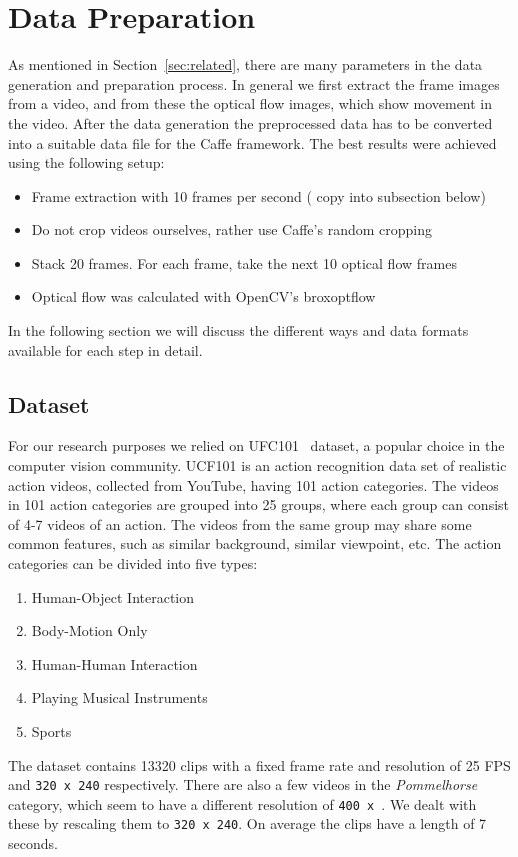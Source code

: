 \section{Data Preparation}
\label{sec:data}

As mentioned in Section~\ref{sec:related}, there are many parameters in the data generation and preparation process.
In general we first extract the frame images from a video, and from these the optical flow images, which show movement in the video.
After the data generation the preprocessed data has to be converted into a suitable data file for the Caffe framework.
The best results were achieved using the following setup:
\begin{itemize}
	\item Frame extraction with 10 frames per second ( copy into subsection below)
	\item Do not crop videos ourselves, rather use Caffe's random cropping
	\item Stack 20 frames. For each frame, take the next 10 optical flow frames
	\item Optical flow was calculated with OpenCV's broxoptflow~\cite{brox2004high}
\end{itemize}
In the following section we will discuss the different ways and data formats available for each step in detail.

\subsection{Dataset}
For our research purposes we relied on UFC101~\cite{soomro2012ucf101} dataset, a popular choice in the computer vision community.
UCF101 is an action recognition data set of realistic action videos, collected from YouTube, having 101 action categories.
The videos in 101 action categories are grouped into 25 groups, where each group can consist of 4-7 videos of an action.
The videos from the same group may share some common features, such as similar background, similar viewpoint, etc.
The action categories can be divided into five types:
\begin{enumerate}
\item Human-Object Interaction
\item Body-Motion Only
\item Human-Human Interaction
\item Playing Musical Instruments
\item Sports
\end{enumerate}
The dataset contains 13320 clips with a fixed frame rate and resolution of 25 FPS and \texttt{320 x 240} respectively.
There are also a few videos in the \emph{Pommelhorse} category, which seem to have a different resolution of \texttt{400 x }.
We dealt with these by rescaling them to \texttt{320 x 240}.
On average the clips have a length of 7 seconds.


